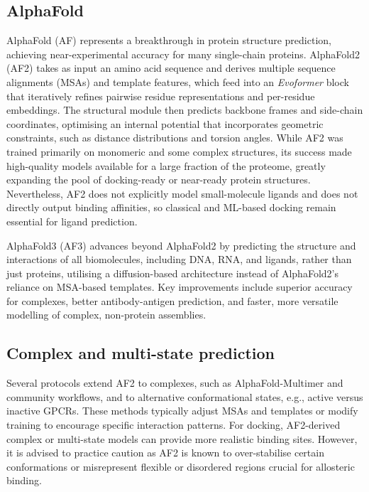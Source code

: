 \documentclass[12pt]{article}
\begin{document}
\subsection{AlphaFold}

AlphaFold (AF)\cite{CH13_jumper2021alphafold} represents a breakthrough in protein structure prediction, achieving near-experimental accuracy for many single-chain proteins. AlphaFold2 (AF2) takes as input an amino acid sequence and derives multiple sequence alignments (MSAs) and template features, which feed into an \emph{Evoformer} block that iteratively refines pairwise residue representations and per-residue embeddings. The structural module then predicts backbone frames and side-chain coordinates, optimising an internal potential that incorporates geometric constraints, such as distance distributions and torsion angles\cite{CH13_jumper2021alphafold,CH13_alphafoldreview2021}. While AF2 was trained primarily on monomeric and some complex structures, its success made high-quality models available for a large fraction of the proteome, greatly expanding the pool of docking-ready or near-ready protein structures\cite{CH13_humanproteome2021,CH13_alphafoldimpact2022}. Nevertheless, AF2 does not explicitly model small-molecule ligands and does not directly output binding affinities, so classical and ML-based docking remain essential for ligand prediction.

AlphaFold3 (AF3)\cite{CH13_abramson2024accurate} advances beyond AlphaFold2 by predicting the structure and interactions of all biomolecules, including DNA, RNA, and ligands, rather than just proteins, utilising a diffusion-based architecture instead of AlphaFold2’s reliance on MSA-based templates. Key improvements include superior accuracy for complexes, better antibody-antigen prediction, and faster, more versatile modelling of complex, non-protein assemblies. 

\subsection{Complex and multi-state prediction}

Several protocols extend AF2 to complexes, such as AlphaFold-Multimer and community workflows, and to alternative conformational states, e.g., active versus inactive GPCRs\cite{CH13_multistategpcr2021,CH13_proteinpredictionuntilcasp15}. These methods typically adjust MSAs and templates or modify training to encourage specific interaction patterns. For docking, AF2-derived complex or multi-state models can provide more realistic binding sites. However, it is advised to practice caution as AF2 is known to over-stabilise certain conformations or misrepresent flexible or disordered regions crucial for allosteric binding\cite{CH13_alphafoldimpact2022,CH13_alphafoldlimitations2023,CH13_deepallostery2024}.
\end{document}
